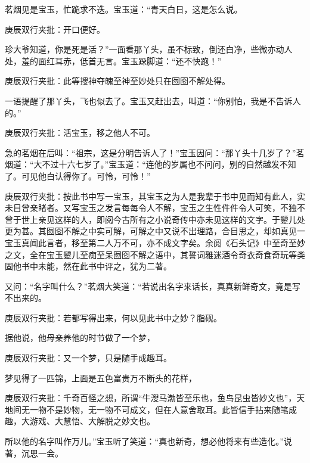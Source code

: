 \begin{parag}


    茗烟见是宝玉，忙跪求不迭。宝玉道：“青天白日，这是怎么说。\begin{note}庚辰双行夹批：开口便好。\end{note}珍大爷知道，你是死是活？”一面看那丫头，虽不标致，倒还白净，些微亦动人处，羞的面红耳赤，低首无言。宝玉跺脚道：“还不快跑！”\begin{note}庚辰双行夹批：此等搜神夺魄至神至妙处只在囫囵不解处得。\end{note}一语提醒了那丫头，飞也似去了。宝玉又赶出去，叫道：“你别怕，我是不告诉人的。”\begin{note}庚辰双行夹批：活宝玉，移之他人不可。\end{note}急的茗烟在后叫：“祖宗，这是分明告诉人了！”宝玉因问：“那丫头十几岁了？”茗烟道：“大不过十六七岁了。”宝玉道：“连他的岁属也不问问，别的自然越发不知了。可见他白认得你了。可怜，可怜！”\begin{note}庚辰双行夹批：按此书中写一宝玉，其宝玉之为人是我辈于书中见而知有此人，实未目曾亲睹者。又写宝玉之发言每每令人不解，宝玉之生性件件令人可笑，不独不曾于世上亲见这样的人，即阅今古所有之小说奇传中亦未见这样的文字。于颦儿处更为甚。其囫囵不解之中实可解，可解之中又说不出理路，合目思之，却如真见一宝玉真闻此言者，移至第二人万不可，亦不成文字矣。余阅《石头记》中至奇至妙之文，全在宝玉颦儿至痴至呆囫囵不解之语中，其誓词雅迷酒令奇衣奇食奇玩等类固他书中未能，然在此书中评之，犹为二著。\end{note}又问：“名字叫什么？”茗烟大笑道：“若说出名字来话长，真真新鲜奇文，竟是写不出来的。\begin{note}庚辰双行夹批：若都写得出来，何以见此书中之妙？脂砚。\end{note}据他说，他母亲养他的时节做了一个梦，\begin{note}庚辰双行夹批：又一个梦，只是随手成趣耳。\end{note}梦见得了一匹锦，上面是五色富贵万不断头的花样，\begin{note}庚辰双行夹批：千奇百怪之想，所谓“牛溲马渤皆至乐也，鱼鸟昆虫皆妙文也”，天地间无一物不是妙物，无一物不可成文，但在人意舍取耳。此皆信手拈来随笔成趣，大游戏、大慧悟、大解脱之妙文也。\end{note}所以他的名字叫作万儿。”宝玉听了笑道：“真也新奇，想必他将来有些造化。”说著，沉思一会。
\end{parag}


